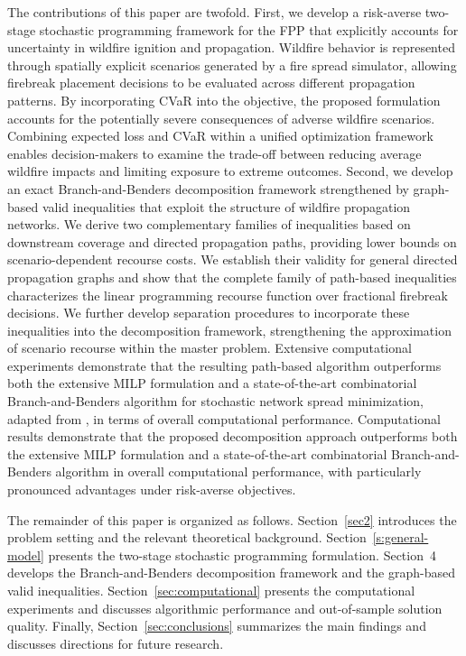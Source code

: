 \documentclass{itor}
\begin{document}
The contributions of this paper are twofold. First, we develop a risk-averse two-stage stochastic
programming framework for the FPP that explicitly
accounts for uncertainty in wildfire ignition and
propagation. Wildfire behavior is represented through
spatially explicit scenarios generated by a fire
spread simulator, allowing firebreak placement
decisions to be evaluated across different propagation
patterns. By incorporating CVaR into the objective,
the proposed formulation accounts for the potentially
severe consequences of adverse wildfire scenarios.
Combining expected loss and CVaR within a unified
optimization framework enables decision-makers to
examine the trade-off between reducing average
wildfire impacts and limiting exposure to extreme
outcomes. Second, we develop an exact Branch-and-Benders
decomposition framework strengthened by graph-based
valid inequalities that exploit the structure of
wildfire propagation networks. We derive two
complementary families of inequalities based on
downstream coverage and directed propagation paths,
providing lower bounds on scenario-dependent
recourse costs. We establish their validity for
general directed propagation graphs and show that
the complete family of path-based inequalities
characterizes the linear programming recourse
function over fractional firebreak decisions.
We further develop separation procedures to
incorporate these inequalities into the decomposition
framework, strengthening the approximation of
scenario recourse within the master problem.
Extensive computational experiments demonstrate
that the resulting path-based algorithm outperforms
both the extensive MILP formulation and a
state-of-the-art combinatorial Branch-and-Benders
algorithm for stochastic network spread minimization,
adapted from \citet{taninmics2024benders}, in
terms of overall computational performance. Computational results demonstrate that the proposed
decomposition approach outperforms both the extensive
MILP formulation and a state-of-the-art combinatorial
Branch-and-Benders algorithm in overall computational
performance, with particularly pronounced advantages
under risk-averse objectives.

The remainder of this paper is organized as follows.
Section~\ref{sec2} introduces the problem setting
and the relevant theoretical background.
Section~\ref{s:general-model} presents the two-stage
stochastic programming formulation. Section~4
develops the Branch-and-Benders decomposition
framework and the graph-based valid inequalities.
Section~\ref{sec:computational} presents the
computational experiments and discusses algorithmic
performance and out-of-sample solution quality.
Finally, Section~\ref{sec:conclusions} summarizes
the main findings and discusses directions for
future research.
\end{document}
